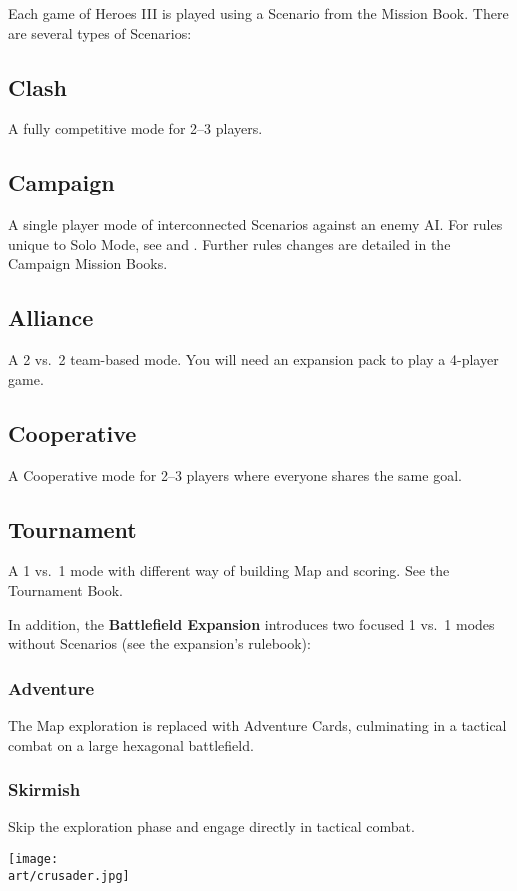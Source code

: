 
\begin{multicols*}{2}

Each game of Heroes III is played using a Scenario from the Mission Book.
There are several types of Scenarios:

\subsection*{Clash}
A fully competitive mode for 2--3 players.

\subsection*{Campaign}
A single player mode of interconnected Scenarios against an enemy AI.
For rules unique to Solo Mode, see  and .
Further rules changes are detailed in the Campaign Mission Books.

\subsection*{Alliance}
A 2 vs.~2 team-based mode.
You will need an expansion pack to play a 4-player game.

\subsection*{Cooperative}
A Cooperative mode for 2--3 players where everyone shares the same goal.

\subsection*{Tournament}
A 1 vs.~1 mode with different way of building Map and scoring. See the Tournament Book.

\begin{center}
\end{center}

\columnbreak

In addition, the \textbf{Battlefield Expansion} introduces two focused 1 vs.~1 modes without Scenarios (see the expansion's rulebook):

\subsubsection*{Adventure}
The Map exploration is replaced with Adventure Cards, culminating in a tactical combat on a large hexagonal battlefield.

\subsubsection*{Skirmish}
Skip the exploration phase and engage directly in tactical combat.

\bigskip
\vspace*{\fill}
\texttt{[image: \\art/crusader.jpg]}
\vspace*{\fill}

\end{multicols*}
